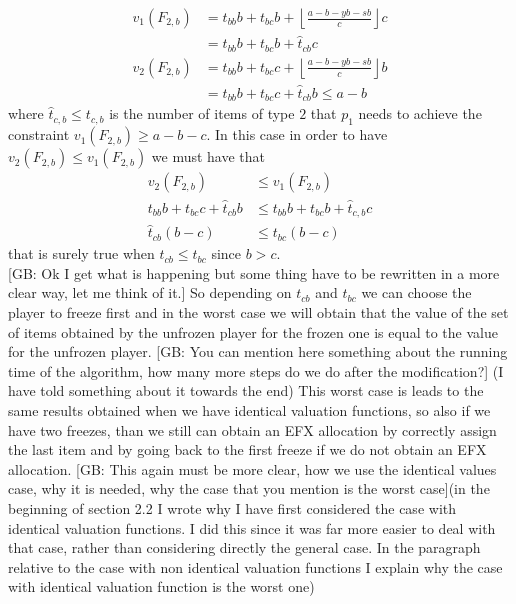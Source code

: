 \documentclass{article}
\newcommand{\gb}[1]{{\color{red}[GB: #1]}}
\begin{document}
\begin{align*}
    v_1(F_{2,b}) &= t_{bb}b + t_{bc}b + \left\lfloor \frac{a-b-yb-sb}{c}\right\rfloor c \\
                & = t_{bb}b + t_{bc}b + \hat t_{cb} c\\
    v_2(F_{2,b}) &= t_{bb}b + t_{bc}c + \left\lfloor \frac{a-b-yb-sb}{c}\right\rfloor b \\
                & = t_{bb}b + t_{bc}c + \hat t_{cb} b \le a-b
\end{align*}
where $ \hat t_{c,b}\le t_{c,b}$ is the number of items of type $2$ that $p_1$ needs to achieve the constraint $v_1(F_{2,b})\ge a-b-c$. In this case in order to have $v_2(F_{2,b}) \le v_1(F_{2,b})$ we must have that
\begin{align*}
    v_2(F_{2,b}) &\le v_1(F_{2,b})\\
    t_{bb}b + t_{bc}c +  \hat t_{cb} b &\le t_{bb}b + t_{bc}b +  \hat t_{c,b} c\\
    \hat t_{cb}(b-c) &\le t_{bc}(b-c)
\end{align*}
that is surely true when $t_{cb}\le t_{bc}$ since $b> c$.\\
\gb{Ok I get what is happening but some thing have to be rewritten in a more clear way, let me think of it.}
So depending on $t_{cb}$ and $t_{bc}$ we can choose the player to freeze first and in the worst case we will obtain that the value of the set of items obtained by the unfrozen player for the frozen one is equal to the value for the unfrozen player.
\gb{You can mention here something about the running time of the algorithm, how many more steps do we do after the modification?} (I have told something about it towards the end)
This worst case is leads to the same results obtained when we have identical valuation functions, so also if we have two freezes, than we still can obtain an EFX allocation by correctly assign the last item and by going back to the first freeze if we do not obtain an EFX allocation.
\gb{This again must be more clear, how we use the identical values case, why it is needed, why the case that you mention is the worst case}(in the beginning of section 2.2 I wrote why I have first considered the case with identical valuation functions. I did this since it was far more easier to deal with that case, rather than considering directly the general case. In the paragraph relative to the case with non identical valuation functions I explain why the case with identical valuation function is the worst one)
\end{document}
